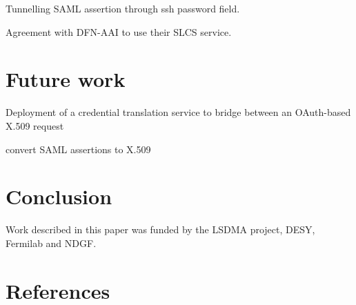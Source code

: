 \documentclass[a4paper]{jpconf}
\begin{document}
Tunnelling SAML assertion through ssh password field.

Agreement with DFN-AAI to use their SLCS service.

\section{Future work}

Deployment of a credential translation service to bridge between an
OAuth-based X.509 request

convert SAML assertions to X.509 

\section{Conclusion}

\ack

Work described in this paper was funded by the LSDMA project, DESY,
Fermilab and NDGF.

\section*{References}

\end{document}
